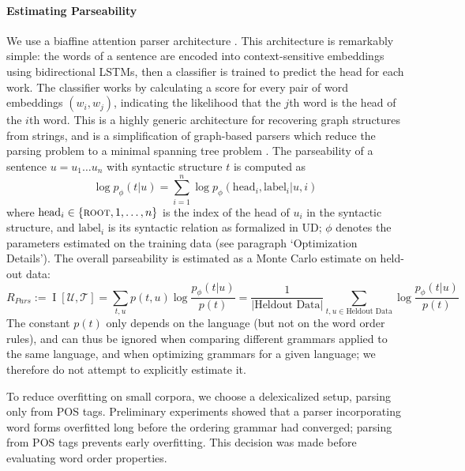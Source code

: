 \documentclass[10pt,twoside,lineno]{article}
\newcommand{\utterance}{\mathcal{U}}
\newcommand{\tree}{\mathcal{T}}
\begin{document}
\paragraph{Estimating Parseability}
We use a biaffine attention parser architecture \citep{kiperwasser2016simple,zhang2017dependency,dozat2017stanford}. This architecture is remarkably simple: the words of a sentence are encoded into context-sensitive embeddings using bidirectional LSTMs, then a classifier is trained to predict the head for each work. The classifier works by calculating a score for every pair of word embeddings $(w_i, w_j)$, indicating the likelihood that the $j$th word is the head of the $i$th word. This is a highly generic architecture for recovering graph structures from strings, and is a simplification of graph-based parsers which reduce the parsing problem to a minimal spanning tree problem \citep{mcdonald2005nonprojective}.
The parseability of a sentence $u = u_1\dots u_n$ with syntactic structure $t$ is computed as
\begin{equation}
	\log p_\phi(t|u) = \sum_{i=1}^n \log p_\phi(\text{head}_i, \text{label}_i | u, i)
\end{equation}
where $\text{head}_i \in \{\textsc{root}, 1,\dots,n\}$ is the index of the head of $u_i$ in the syntactic structure, and $\text{label}_i$ is its syntactic relation as formalized in UD; $\phi$ denotes the parameters estimated on the training data (see paragraph `Optimization Details').
The overall parseability is estimated as a Monte Carlo estimate on held-out data:
\begin{equation}\label{eq:rpars}
	R_{Pars} := \operatorname{I}[\utterance,\tree] = \sum_{t,u} p(t,u) \log \frac{p_\phi(t|u)}{p(t)} = \frac{1}{|\text{Heldout Data}|} \sum_{t,u \in \text{Heldout Data}} \log \frac{p_\phi(t|u)}{p(t)}
\end{equation}
The constant $p(t)$ only depends on the language (but not on the word order rules), and can thus be ignored when comparing different grammars applied to the same language, and when optimizing grammars for a given language; we therefore do not attempt to explicitly estimate it.


To reduce overfitting on small corpora, we choose a delexicalized setup, parsing only from POS tags. Preliminary experiments showed that a parser incorporating word forms overfitted long before the ordering grammar had converged; parsing from POS tags prevents early overfitting.
This decision was made before evaluating word order properties.
\end{document}
